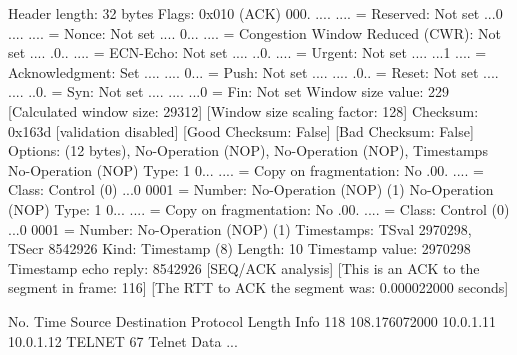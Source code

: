     Header length: 32 bytes
    Flags: 0x010 (ACK)
        000. .... .... = Reserved: Not set
        ...0 .... .... = Nonce: Not set
        .... 0... .... = Congestion Window Reduced (CWR): Not set
        .... .0.. .... = ECN-Echo: Not set
        .... ..0. .... = Urgent: Not set
        .... ...1 .... = Acknowledgment: Set
        .... .... 0... = Push: Not set
        .... .... .0.. = Reset: Not set
        .... .... ..0. = Syn: Not set
        .... .... ...0 = Fin: Not set
    Window size value: 229
    [Calculated window size: 29312]
    [Window size scaling factor: 128]
    Checksum: 0x163d [validation disabled]
        [Good Checksum: False]
        [Bad Checksum: False]
    Options: (12 bytes), No-Operation (NOP), No-Operation (NOP), Timestamps
        No-Operation (NOP)
            Type: 1
                0... .... = Copy on fragmentation: No
                .00. .... = Class: Control (0)
                ...0 0001 = Number: No-Operation (NOP) (1)
        No-Operation (NOP)
            Type: 1
                0... .... = Copy on fragmentation: No
                .00. .... = Class: Control (0)
                ...0 0001 = Number: No-Operation (NOP) (1)
        Timestamps: TSval 2970298, TSecr 8542926
            Kind: Timestamp (8)
            Length: 10
            Timestamp value: 2970298
            Timestamp echo reply: 8542926
    [SEQ/ACK analysis]
        [This is an ACK to the segment in frame: 116]
        [The RTT to ACK the segment was: 0.000022000 seconds]

No.     Time           Source                Destination           Protocol Length Info
    118 108.176072000  10.0.1.11             10.0.1.12             TELNET   67     Telnet Data ...

